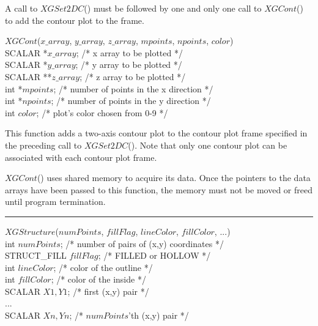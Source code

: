 A call to $XGSet2DC$() must be followed by one and only one call to $XGCont$()
to add the contour plot to the frame.

\newpage
\begin{flushleft}
$XGCont$($x\_array$, $y\_array$, $z\_array$, $mpoints$, $npoints$, $color$) \\
SCALAR   *$x\_array$;    /* x array to be plotted                         */ \\
SCALAR   *$y\_array$;    /* y array to be plotted                         */ \\
SCALAR  **$z\_array$;    /* z array to be plotted                         */ \\
int     *$mpoints$;    /* number of points in the x direction            */ \\
int     *$npoints$;    /* number of points in the y direction            */ \\
int      $color$;      /* plot's color chosen from 0-9                   */
\end{flushleft}

This function adds a two-axis contour plot to the contour plot frame 
specified in the preceding call to $XGSet2DC$().  Note that only one
contour plot can be associated with each contour plot frame.

$XGCont$() uses shared memory to acquire its data.  Once the pointers to the
data arrays have been passed to this function, the memory must not be moved
or freed until program termination.

\def\xlen{4in}
\begin{minipage}{\xlen}
\begin{flushright}
\rule{\xlen}{.5pt}
\end{flushright}
\end{minipage}

\begin{flushleft}
$XGStructure$($numPoints$, $fillFlag$, $lineColor$, $fillColor$, $...$) \\
int 		$numPoints$;	/* number of pairs of (x,y) coordinates */ \\
STRUCT\_FILL 	$fillFlag$;	/* FILLED or HOLLOW */ \\
int		$lineColor$;	/* color of the outline */ \\
int		$fillColor$;	/* color of the inside */ \\
SCALAR		$X1, Y1$;	/* first (x,y) pair */ \\
... \\
SCALAR		$Xn, Yn$;	/* $numPoints$'th (x,y) pair */
\end{flushleft}

